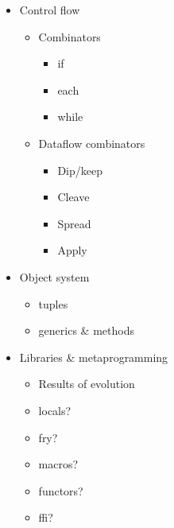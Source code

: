 \documentclass[11pt]{article}
\begin{document}
\begin{itemize}
\item Control flow
      \begin{itemize}
        \item Combinators
              \begin{itemize}
                \item if
                \item each
                \item while
              \end{itemize}
        \item Dataflow combinators
              \begin{itemize}
                \item Dip/keep
                \item Cleave
                \item Spread
                \item Apply
              \end{itemize}
      \end{itemize}

\item Object system
      \begin{itemize}
        \item tuples
        \item generics \& methods
      \end{itemize}

\item Libraries \& metaprogramming
      \begin{itemize}
        \item Results of evolution
        \item locals?
        \item fry?
        \item macros?
        \item functors?
        \item ffi?
      \end{itemize}

\end{itemize}
\end{document}
